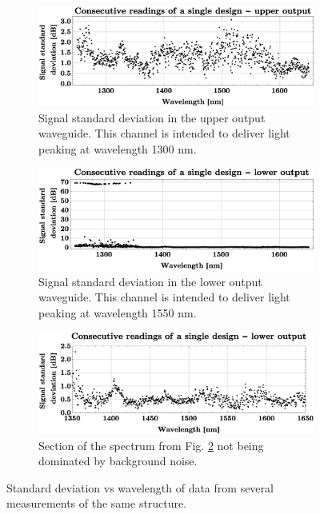 \begin{figure}[h!]
    \centering
    \begin{subfigure}[h!]{0.8\textwidth}
    \includegraphics[width=\textwidth]{fig/statistics/ReproducibilityTestUpper.eps}
    \caption{Signal standard deviation in the upper output waveguide. This channel is intended to deliver light peaking at wavelength 1300 nm.}
    \label{fig:RepNorm1}
    \end{subfigure}

     \begin{subfigure}[h!]{0.8\textwidth}
    \includegraphics[width=\textwidth]{fig/statistics/ReproducibilityTestLower1250.eps}
    \caption{Signal standard deviation in the lower output waveguide. This channel is intended to deliver light peaking at wavelength 1550 nm.}
    \label{fig:RepNorm2}
    \end{subfigure}

     \begin{subfigure}[h!]{0.8\textwidth}
    \includegraphics[width=\textwidth]{fig/statistics/ReproducibilityTestLower1350.eps}
    \caption{Section of the spectrum from Fig. \ref{fig:RepNorm2} not being dominated by background noise.}
    \label{fig:RepNorm3}
    \end{subfigure}
    
    \caption{Standard deviation vs wavelength of data from several measurements of the same structure.}
    \label{fig:RepNorm}
\end{figure}

